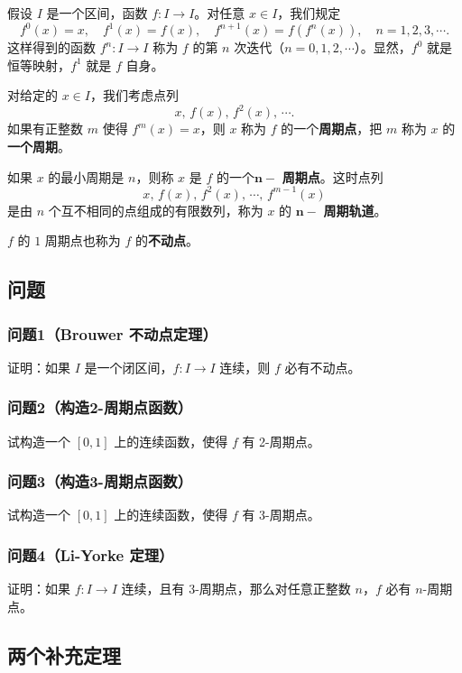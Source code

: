 \documentclass[12pt]{ctexart}
\begin{document}
假设 $I$ 是一个区间，函数 $f: I \to I$。对任意 $x \in I$，我们规定
\[
f^0(x) = x, \quad f^1(x) = f(x), \quad f^{n+1}(x) = f(f^n(x)), \quad n = 1, 2, 3, \cdots.
\]
这样得到的函数 $f^n: I \to I$ 称为 $f$ 的第 $n$ 次迭代（$n = 0, 1, 2, \cdots$）。显然，$f^0$ 就是恒等映射，$f^1$ 就是 $f$ 自身。

对给定的 $x \in I$，我们考虑点列
\[
x, \, f(x), \, f^2(x), \, \cdots.
\]
如果有正整数 $m$ 使得 $f^m(x) = x$，则 $x$ 称为 $f$ 的一个\textbf{周期点}，把 $m$ 称为 $x$ 的\textbf{一个周期}。

如果 $x$ 的最小周期是 $n$，则称 $x$ 是 $f$ 的一个$\mathbf{n-}$ \textbf{周期点}。这时点列
\[
x, \, f(x), \, f^2(x), \, \cdots, \, f^{m-1}(x)
\]
是由 $n$ 个互不相同的点组成的有限数列，称为 $x$ 的 $\mathbf{n-}$ \textbf{周期轨道}。

$f$ 的 $1$ 周期点也称为 $f$ 的\textbf{不动点}。

\subsection{问题}

\subsubsection{问题1（Brouwer 不动点定理）}

证明：如果 $I$ 是一个闭区间，$f: I \to I$ 连续，则 $f$ 必有不动点。

\subsubsection{问题2（构造2-周期点函数）}

试构造一个 $[0, 1]$ 上的连续函数，使得 $f$ 有 2-周期点。

\subsubsection{问题3（构造3-周期点函数）}

试构造一个 $[0, 1]$ 上的连续函数，使得 $f$ 有 3-周期点。

\subsubsection{问题4（Li-Yorke 定理）}

证明：如果 $f: I \to I$ 连续，且有 3-周期点，那么对任意正整数 $n$，$f$ 必有 $n$-周期点。

\subsection{两个补充定理}
\end{document}
